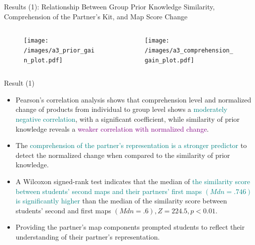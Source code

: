 \begin{frame}{Results (1): Relationship Between Group Prior Knowledge Similarity, 
   Comprehension of the Partner’s Kit, and Map Score Change}
    \begin{columns}
        \begin{column}{0.5\textwidth}
            \begin{center}
                \begin{figure}[tb]
                    \texttt{[image: /images/a3\_prior\_gain\_plot.pdf]}
                    \label{prior_gain}
                \end{figure}
            \end{center}
        \end{column}
        \begin{column}{0.5\textwidth}  %
            \begin{center}
                \begin{figure}[tb]
                    \texttt{[image: /images/a3\_comprehension\_gain\_plot.pdf]}
                    \label{comprehension_gain}
                \end{figure}
            \end{center}
        \end{column}
    \end{columns} 
\end{frame}


\begin{frame}{Result (1)}

\begin{itemize}
    
    \item <1-2> {\small Pearson’s correlation analysis shows that comprehension level and normalized change of products from individual to group level shows a \textcolor{teal}{moderately negative correlation}, with a significant coefficient, while similarity of prior knowledge reveals a \textcolor{purple}{weaker correlation with normalized change}.} 
    \item <2> {\small The \textcolor{teal}{comprehension of the partner’s representation is a stronger predictor} to detect the normalized change when compared to the similarity of prior knowledge.}
    \item <3-4> {\small A Wilcoxon signed-rank test indicates that the median of \textcolor{teal}{the similarity score between students' second maps and their partners' first maps $(Mdn = .746)$ is significantly higher} than the median of the similarity score between students' second and first maps $(Mdn=.6), Z= 224.5, p<0.01$.}
    \item <4> {\small Providing the partner's map components prompted students to reflect their understanding of their partner's representation.}

\end{itemize}

\end{frame}

